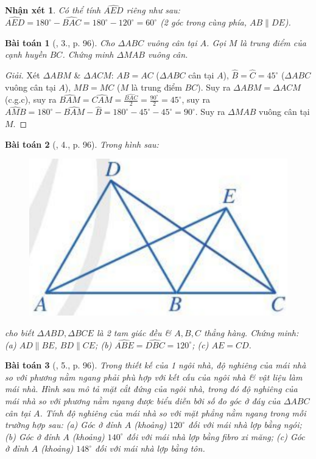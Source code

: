 \documentclass{article}
\newtheorem{baitoan}{Bài toán}
\newtheorem{nhanxet}{Nhận xét}
\begin{document}
\begin{nhanxet}
	Có thể tính $\widehat{AED}$ riêng như sau: $\widehat{AED} = 180^\circ - \widehat{BAC} = 180^\circ - 120^\circ = 60^\circ$ (2 góc trong cùng phía, $AB\parallel DE$).
\end{nhanxet}

\begin{baitoan}[\cite{SGK_Toan_7_Canh_Dieu_tap_2}, 3., p. 96]
	Cho $\Delta ABC$ vuông cân tại $A$. Gọi $M$ là trung điểm của cạnh huyền $BC$. Chứng minh $\Delta MAB$ vuông cân.
\end{baitoan}

\begin{proof}[Giải]
	Xét $\Delta ABM$ \& $\Delta ACM$: $AB = AC$ ($\Delta ABC$ cân tại $A$), $\widehat{B} = \widehat{C} = 45^\circ$ ($\Delta ABC$ vuông cân tại $A$), $MB = MC$ ($M$ là trung điểm $BC$). Suy ra $\Delta ABM = \Delta ACM$ (c.g.c), suy ra $\widehat{BAM} = \widehat{CAM} = \frac{\widehat{BAC}}{2} = \frac{90^\circ}{2} = 45^\circ$, suy ra $\widehat{AMB} = 180^\circ - \widehat{BAM} - \widehat{B} = 180^\circ - 45^\circ - 45^\circ = 90^\circ$. Suy ra $\Delta MAB$  vuông cân tại $M$.
\end{proof}

\begin{baitoan}[\cite{SGK_Toan_7_Canh_Dieu_tap_2}, 4., p. 96]
	Trong hình sau:
	\begin{figure}[H]
		\centering
		\includegraphics[scale=.2]{SGK_Toan_7_CD_76}
	\end{figure}
	\noindent cho biết $\Delta ABD,\Delta BCE$ là 2 tam giác đều \& $A,B,C$ thẳng hàng. Chứng minh: (a) $AD\parallel BE$, $BD\parallel CE$; (b) $\widehat{ABE} = \widehat{DBC} = 120^\circ$; (c) $AE = CD$.
\end{baitoan}

\begin{baitoan}[\cite{SGK_Toan_7_Canh_Dieu_tap_2}, 5., p. 96]
	Trong thiết kế của 1 ngôi nhà, độ nghiêng của mái nhà so với phương nằm ngang phải phù hợp với kết cấu của ngôi nhà \& vật liệu làm mái nhà. Hình sau mô tả mặt cắt đứng của ngôi nhà, trong đó độ nghiêng của mái nhà so với phương nằm ngang được biểu diễn bởi số đo góc ở đáy của $\Delta ABC$ cân tại $A$. Tính độ nghiêng của mái nhà so với mặt phẳng nằm ngang trong mỗi trường hợp sau: (a) Góc ở đỉnh $A$ (khoảng) $120^\circ$ đối với mái nhà lợp bằng ngói; (b) Góc ở đỉnh $A$ (khoảng) $140^\circ$ đối với mái nhà lợp bằng fibro xi măng; (c) Góc ở đỉnh $A$ (khoảng) $148^\circ$ đối với mái nhà lợp bằng tôn.
\end{baitoan}
\end{document}
